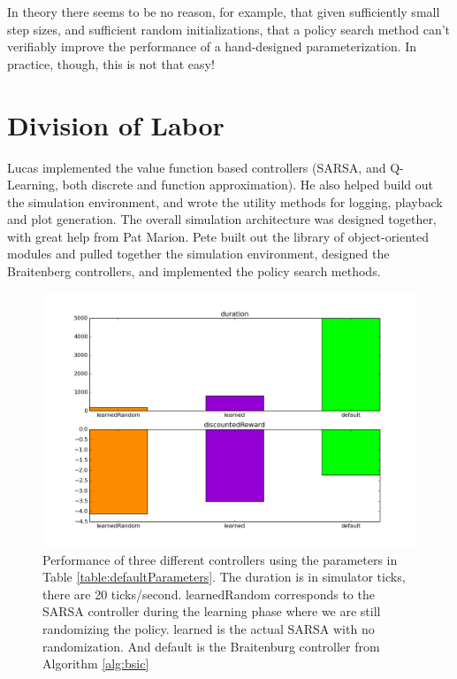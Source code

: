 \documentclass{article}
\begin{document}
In theory there seems to be no reason, for example, that given sufficiently small step sizes, and sufficient random initializations, that a policy search method can't verifiably improve the performance of a hand-designed parameterization. In practice, though, this is not that easy!

\section{Division of Labor}

Lucas implemented the value function based controllers (SARSA, and Q-Learning, both discrete and function approximation). He also helped build out the simulation environment, and wrote the utility methods for logging, playback and plot generation. The overall simulation architecture was designed together, with great help from Pat Marion. Pete built out the library of object-oriented modules and pulled together the simulation environment, designed the Braitenberg controllers, and implemented the policy search methods.


\begin{figure}
\centering
\includegraphics[scale=0.5]{figures/sarsaDiscrete_lam_0_7_6500_bar_all_controllers.png}
\caption{Performance of three different controllers using the parameters in Table \ref{table:defaultParameters}. The duration is in simulator ticks, there are 20 ticks/second. learnedRandom corresponds to the SARSA controller during the learning phase where we are still randomizing the policy. learned is the actual SARSA with no randomization. And default is the Braitenburg controller from Algorithm \ref{alg:bsic} }
\label{figures/sarsaDiscrete_lam_0_7_6500_bar_all_controllers.png}
\end{figure}
\end{document}
